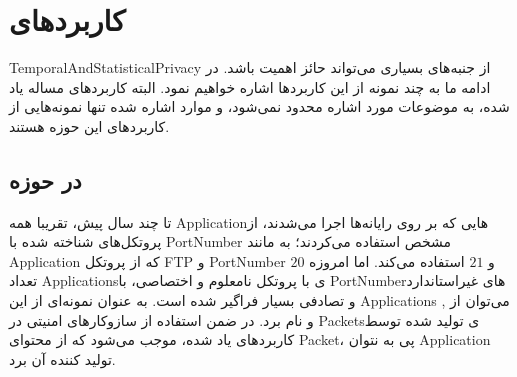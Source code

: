\section{کاربردهای }
\label{sec:IntroApplications}
\gls*{TemporalAndStatisticalPrivacy}
از جنبه‌های بسیاری می‌تواند حائز اهمیت باشد. در ادامه ما به چند نمونه از این کاربردها اشاره خواهیم نمود. البته کاربردهای مساله یاد شده، به موضوعات مورد اشاره محدود نمی‌شود، و موارد اشاره شده تنها نمونه‌هایی از کاربردهای این حوزه هستند.

\subsection{  در حوزه } 
تا چند سال پیش، تقریبا همه  ‎\gls{Application}هایی که بر روی رایانه‌ها اجرا می‌شدند، از پروتکل‌های شناخته شده با ‎\gls{PortNumber}‎ مشخص استفاده می‌کردند؛ به مانند
\gls{Application} 
که از پروتکل
\gls{FTP} و \gls{PortNumber} $20$ و $21$
استفاده می‌کند. اما امروزه تعداد
‎\glspl{Application}‎ی
با پروتکل نامعلوم و اختصاصی، با ‎\gls{PortNumber}‎های غیراستاندارد و تصادفی بسیار فراگیر شده است. به عنوان نمونه‌ای از این 
\glspl{Application}‎
می‌توان از 
,   و 
نام برد. در ضمن استفاده از سازوکارهای امنیتی در \glspl{Packet}ی تولید شده توسط کاربردهای یاد شده، موجب می‌شود که از محتوای \gls{Packet}، نتوان ‎‎‎‎پی به ‎‎\gls{Application}‎ تولید کننده آن برد. 

